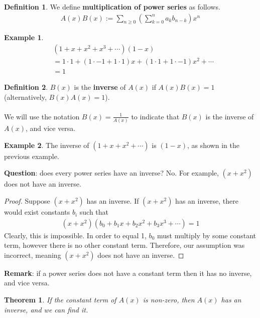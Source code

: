 \documentclass[]{article}
\newtheorem*{theorem}{Theorem}
\theoremstyle{definition}
\newtheorem*{defn}{Definition}
\newtheorem{ex}{Example}[section]
\begin{document}
			\begin{defn}
				We define \textbf{multiplication of power series} as follows.
				\begin{align*}
					A(x)B(x) := \sum_{n \ge 0} \left( \sum_{k = 0}^{n} a_k b_{n - k} \right) x^n
				\end{align*}
			\end{defn}

			\begin{ex}
				\begin{align*}
					&(1 + x + x^2 + x^3 + \cdots)(1 - x) \\
					&= 1 \cdot 1 + (1 \cdot -1 + 1 \cdot 1)x + (1 \cdot 1 + 1 \cdot -1)x^2 + \cdots \\
					& = 1
				\end{align*}
			\end{ex}

			\begin{defn}
				$B(x)$ is the \textbf{inverse} of $A(x)$ if $A(x)B(x) = 1$ (alternatively, $B(x)A(x) = 1$).
				\\ \\
				We will use the notation $B(x) = \frac{1}{A(x)}$ to indicate that $B(x)$ is the inverse of $A(x)$, and vice versa.
			\end{defn}

			\begin{ex}
				The inverse of $(1 + x + x^2 + \cdots)$ is $(1 - x)$, as shown in the previous example.
			\end{ex}

			\textbf{Question}: does every power series have an inverse? No. For example, $(x + x^2)$ does not have an inverse.
			\begin{proof}
				Suppose $(x + x^2)$ has an inverse. If $(x + x^2)$ has an inverse, there would exist constants $b_i$ such that
				\begin{align*}
					(x + x^2)(b_0 + b_1x + b_2x^2 + b_3x^3 + \cdots) = 1
				\end{align*}
				Clearly, this is impossible. In order to equal 1, $b_0$ must multiply by some constant term, however there is no other constant term. Therefore, our assumption was incorrect, meaning $(x + x^2)$ does not have an inverse.
			\end{proof}

			\textbf{Remark}: if a power series does not have a constant term then it has no inverse, and vice versa.
			\begin{theorem}
				If the constant term of $A(x)$ is non-zero, then $A(x)$ has an inverse, and we can find it.
			\end{theorem}
\end{document}
